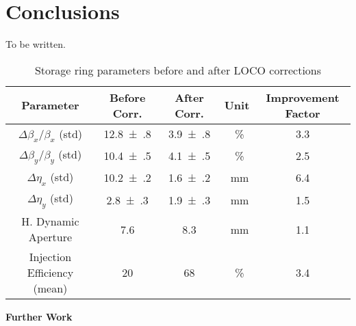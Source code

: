 \chapter*[Conclusions]{Conclusions}
    To be written.
    
\begin{table}[h!]
    \centering
    \caption{Storage ring parameters before and after LOCO corrections}
    \label{tab:params_corr}
    \begin{tabular}{ccccc}
        \toprule\toprule
        Parameter & Before Corr. & After Corr. & Unit & Improvement Factor\\
        \hline
        $\Delta\beta_x/\beta_x$ (std) & \num{12.8(8)} & \num{3.9(8)} & \SI{}{\%} & \num{3.3} \\
        $\Delta\beta_y/\beta_y$ (std) & \num{10.4(5)} & \num{4.1(5)} & \SI{}{\%} & \num{2.5} \\
        $\Delta\eta_x$ (std) &  \num{10.2(2)} &  \num{1.6(2)} & \SI{}{\milli\meter} & \num{6.4} \\
        $\Delta\eta_y$ (std) &  \num{2.8(3)} &  \num{1.9(3)} & \SI{}{\milli\meter}& \num{1.5} \\
        H. Dynamic Aperture  & \num{7.6} & \num{8.3} & \SI{}{\milli\meter} & \num{1.1} \\
        Injection Efficiency (mean)  & \num{20} & \num{68} & \SI{}{\%} & \num{3.4} \\
        \bottomrule\bottomrule
    \end{tabular}
\end{table}

\textbf{Further Work}